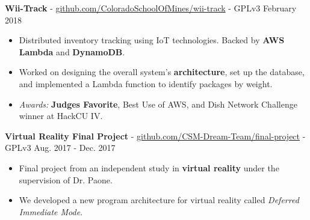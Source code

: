 \documentclass[10pt,letterpaper]{article}
\begin{document}
\textbf{Wii-Track} -
\href{https://github.com/ColoradoSchoolOfMines/wii-track}{github.com/ColoradoSchoolOfMines/wii-track}
- GPLv3 \hfill February 2018
\begin{itemize}
    \item Distributed inventory tracking using IoT technologies. Backed by
        \textbf{AWS Lambda} and \textbf{DynamoDB}.
    \item Worked on designing the overall system's \textbf{architecture}, set up
        the database, and implemented a Lambda function to identify packages by
        weight.
    \item \textit{Awards:} \textbf{Judges Favorite}, Best Use of AWS, and Dish
        Network Challenge winner at HackCU IV.
\end{itemize}

\textbf{Virtual Reality Final Project} -
\href{https://github.com/CSM-Dream-Team/final-project}{github.com/CSM-Dream-Team/final-project}
- GPLv3 \hfill Aug. 2017 - Dec. 2017
\begin{itemize}
    \item Final project from an independent study in \textbf{virtual reality}
        under the supervision of Dr. Paone.
    \item We developed a new program architecture for virtual reality called
        \textit{Deferred Immediate Mode}.
\end{itemize}
\end{document}
